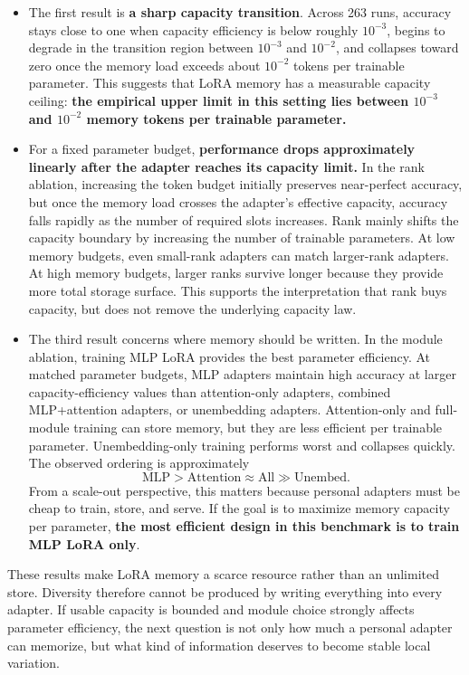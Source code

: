 \begin{itemize}
    \item The first result is \textbf{a sharp capacity transition}. Across 263 runs, accuracy stays close to one when capacity efficiency is below roughly \(10^{-3}\), begins to degrade in the transition region between \(10^{-3}\) and \(10^{-2}\), and collapses toward zero once the memory load exceeds about \(10^{-2}\) tokens per trainable parameter. This suggests that LoRA memory has a measurable capacity ceiling: \textbf{the empirical upper limit in this setting lies between \(10^{-3}\) and \(10^{-2}\) memory tokens per trainable parameter.}
    \item For a fixed parameter budget, \textbf{performance drops approximately linearly after the adapter reaches its capacity limit.} In the rank ablation, increasing the token budget initially preserves near-perfect accuracy, but once the memory load crosses the adapter's effective capacity, accuracy falls rapidly as the number of required slots increases. Rank mainly shifts the capacity boundary by increasing the number of trainable parameters. At low memory budgets, even small-rank adapters can match larger-rank adapters. At high memory budgets, larger ranks survive longer because they provide more total storage surface. This supports the interpretation that rank buys capacity, but does not remove the underlying capacity law.
    \item The third result concerns where memory should be written. In the module ablation, training MLP LoRA provides the best parameter efficiency. At matched parameter budgets, MLP adapters maintain high accuracy at larger capacity-efficiency values than attention-only adapters, combined MLP+attention adapters, or unembedding adapters. Attention-only and full-module training can store memory, but they are less efficient per trainable parameter. Unembedding-only training performs worst and collapses quickly. The observed ordering is approximately
    \[
    \mathrm{MLP} > \mathrm{Attention} \approx \mathrm{All} \gg \mathrm{Unembed}.
    \]
    From a scale-out perspective, this matters because personal adapters must be cheap to train, store, and serve. If the goal is to maximize memory capacity per parameter, \textbf{the most efficient design in this benchmark is to train MLP LoRA only}.
\end{itemize}

These results make LoRA memory a scarce resource rather than an unlimited store. Diversity therefore cannot be produced by writing everything into every adapter. If usable capacity is bounded and module choice strongly affects parameter efficiency, the next question is not only how much a personal adapter can memorize, but what kind of information deserves to become stable local variation.

